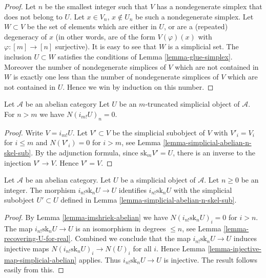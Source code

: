\begin{proof}
Let $n$ be the smallest integer such that $V$ has a nondegenerate
simplex that does not belong to $U$. Let $x \in V_n$, $x\not \in U_n$
be such a nondegenerate simplex. Let $W \subset V$ be the set
of elements which are either in $U$, or are a (repeated) degeneracy
of $x$ (in other words, are of the form $V(\varphi)(x)$
with $\varphi : [m] \to [n]$ surjective). It is easy to see
that $W$ is a simplicial set. The
inclusion $U \subset W$ satisfies the conditions of Lemma
\ref{lemma-glue-simplex}. Moreover the number of nondegenerate
simplices of $V$ which are not contained in $W$ is exactly
one less than the number of nondegenerate
simplices of $V$ which are not contained in $U$.
Hence we win by induction on this number.
\end{proof}

\begin{lemma}
\label{lemma-imshriek-abelian}
Let $\mathcal{A}$ be an abelian category
Let $U$ be an $m$-truncated simplicial object of
$\mathcal{A}$. For $n > m$ we have $N(i_{m!}U)_n = 0$.
\end{lemma}

\begin{proof}
Write $V = i_{m!}U$. Let $V' \subset V$ be the
simplicial subobject of $V$ with $V'_i = V_i$ for $i \leq m$
and $N(V'_i) = 0$ for $i > m$,
see Lemma \ref{lemma-simplicial-abelian-n-skel-sub}.
By the adjunction formula,
since $\text{sk}_m V' = U$, there is an inverse to the
injection $V' \to V$. Hence $V' = V$.
\end{proof}

\begin{lemma}
\label{lemma-n-skeleton-abelian}
Let $\mathcal{A}$ be an abelian category.
Let $U$ be a simplicial object of $\mathcal{A}$.
Let $n \geq 0$ be an integer.
The morphism $i_{n!} \text{sk}_n U \to U$ identifies
$i_{n!} \text{sk}_n U$ with the simplicial subobject
$U' \subset U$ defined in Lemma \ref{lemma-simplicial-abelian-n-skel-sub}.
\end{lemma}

\begin{proof}
By Lemma \ref{lemma-imshriek-abelian}
we have $N(i_{n!} \text{sk}_n U)_i = 0$
for $i > n$. The map
$i_{n!} \text{sk}_n U \to U$ is an isomorphism
in degrees $\leq n$, see Lemma \ref{lemma-recovering-U-for-real}.
Combined we conclude that the map $i_{n!} \text{sk}_n U \to U$
induces injective maps $N(i_{n!} \text{sk}_n U)_i \to N(U)_i$
for all $i$. Hence Lemma \ref{lemma-injective-map-simplicial-abelian}
applies. Thus $i_{n!} \text{sk}_n U \to U$
is injective. The result follows easily from this.
\end{proof}

